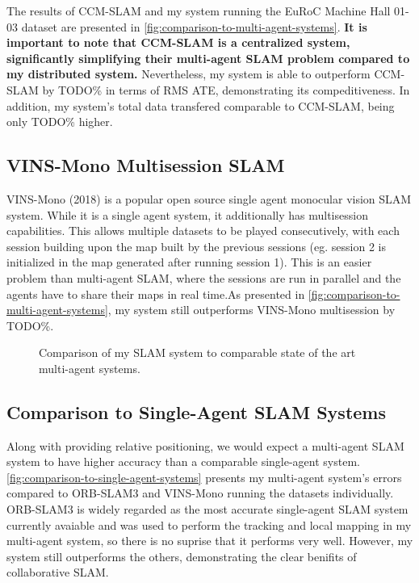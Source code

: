The results of CCM-SLAM and my system running the EuRoC Machine Hall 01-03 dataset are presented in \autoref{fig:comparison-to-multi-agent-systems}. \textbf{It is important to note that CCM-SLAM is a centralized system, significantly simplifying their multi-agent SLAM problem compared to my distributed system.} Nevertheless, my system is able to outperform CCM-SLAM by TODO\% in terms of RMS ATE, demonstrating its compeditiveness. In addition, my system's total data transfered comparable to CCM-SLAM, being only TODO\% higher.

\subsection{VINS-Mono Multisession SLAM}
VINS-Mono (2018) \autocite{8421746} is a popular open source single agent monocular vision SLAM system. While it is a single agent system, it additionally has multisession capabilities. This allows multiple datasets to be played consecutively, with each session building upon the map built by the previous sessions (eg. session 2 is initialized in the map generated after running session 1). This is an easier problem than multi-agent SLAM, where the sessions are run in parallel and the agents have to share their maps in real time.As presented in \autoref{fig:comparison-to-multi-agent-systems}, my system still outperforms VINS-Mono multisession by TODO\%.

\begin{figure}[h]
    \centering

    \caption{Comparison of my SLAM system to comparable state of the art multi-agent systems.}
    \label{fig:comparison-to-multi-agent-systems}
\end{figure}

\subsection{Comparison to Single-Agent SLAM Systems}
Along with providing relative positioning, we would expect a multi-agent SLAM system to have higher accuracy than a comparable single-agent system. \autoref{fig:comparison-to-single-agent-systems} presents my multi-agent system's errors compared to ORB-SLAM3 and VINS-Mono running the datasets individually. ORB-SLAM3 is widely regarded as the most accurate single-agent SLAM system currently avaiable and was used to perform the tracking and local mapping in my multi-agent system, so there is no suprise that it performs very well. However, my system still outperforms the others, demonstrating the clear benifits of collaborative SLAM.

